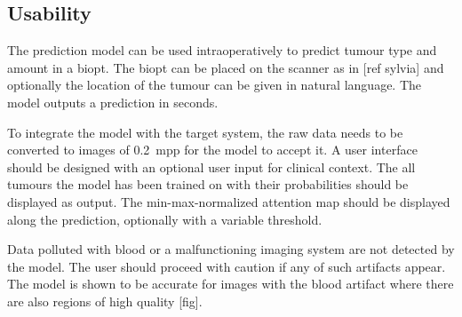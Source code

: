 \subsection{Usability}
The prediction model can be used intraoperatively to predict tumour type and amount in a biopt.
The biopt can be placed on the scanner as in [ref sylvia] and optionally the location of the tumour can be given in natural language.
The model outputs a prediction in seconds.

To integrate the model with the target system, the raw data needs to be converted to images of \qty{0.2}{mpp} for the model to accept it.
A user interface should be designed with an optional user input for clinical context.
The all tumours the model has been trained on with their probabilities should be displayed as output.
The min-max-normalized attention map should be displayed along the prediction, optionally with a variable threshold.

Data polluted with blood or a malfunctioning imaging system are not detected by the model.
The user should proceed with caution if any of such artifacts appear.
The model is shown to be accurate for images with the blood artifact where there are also regions of high quality [fig].
